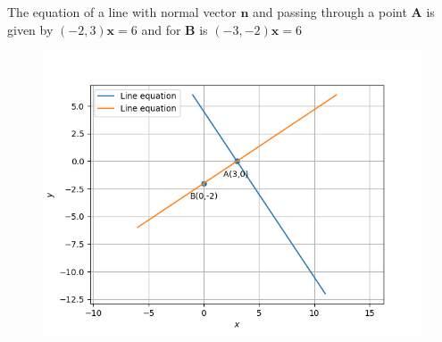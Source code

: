 \documentclass[12pt]{article}
\let\vec\mathbf
\begin{document}
\begin{enumerate}
The equation of a line with normal vector $\vec{n}$ and passing through a point $\vec{A}$ is given by $(-2,3)\vec{x}=6$ and for $\vec{B}$ is $(-3,-2)\vec{x}=6$
\begin{figure}[h!]
\centering
\includegraphics[width=\columnwidth]{./figs/inter.png}
\caption{}
\label{fig:line segment}
\end{figure}
\end{enumerate}
\end{document}
